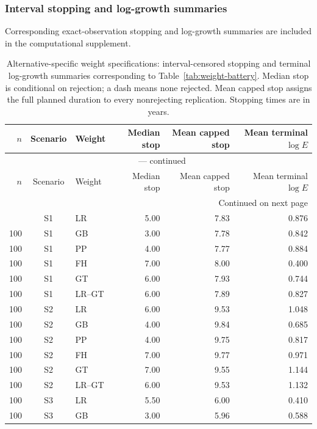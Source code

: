 \documentclass[12pt]{article}
\theoremstyle{definition}
\theoremstyle{remark}
\begin{document}
\subsubsection{Interval stopping and log-growth summaries}
Corresponding exact-observation stopping and log-growth summaries are included in the computational supplement.
\par
\begingroup
\scriptsize
\setlength{\tabcolsep}{3pt}
\renewcommand{\arraystretch}{1.10}
\setlength{\LTcapwidth}{\textwidth}
\begin{longtable}{rclrrr}
\caption{Alternative-specific weight specifications: interval-censored stopping and terminal log-growth summaries corresponding to Table~\ref{tab:weight-battery}. Median stop is conditional on rejection; a dash means none rejected. Mean capped stop assigns the full planned duration to every nonrejecting replication. Stopping times are in years.}\label{tab:app-panel-power}\\
\toprule
$n$ & Scenario & Weight & Median stop & Mean capped stop & Mean terminal $\log E$ \\
\midrule
\endfirsthead
\multicolumn{6}{c}{\tablename\ \thetable{} --- continued}\\
\toprule
$n$ & Scenario & Weight & Median stop & Mean capped stop & Mean terminal $\log E$ \\
\midrule
\endhead
\midrule
\multicolumn{6}{r}{Continued on next page}\\
\endfoot
\bottomrule
\endlastfoot
100 & S1 & LR & 5.00 & 7.83 & 0.876 \\
100 & S1 & GB & 3.00 & 7.78 & 0.842 \\
100 & S1 & PP & 4.00 & 7.77 & 0.884 \\
100 & S1 & FH & 7.00 & 8.00 & 0.400 \\
100 & S1 & GT & 6.00 & 7.93 & 0.744 \\
100 & S1 & LR--GT & 6.00 & 7.89 & 0.827 \\
100 & S2 & LR & 6.00 & 9.53 & 1.048 \\
100 & S2 & GB & 4.00 & 9.84 & 0.685 \\
100 & S2 & PP & 4.00 & 9.75 & 0.817 \\
100 & S2 & FH & 7.00 & 9.77 & 0.971 \\
100 & S2 & GT & 7.00 & 9.55 & 1.144 \\
100 & S2 & LR--GT & 6.00 & 9.53 & 1.132 \\
100 & S3 & LR & 5.50 & 6.00 & 0.410 \\
100 & S3 & GB & 3.00 & 5.96 & 0.588 \\

\end{longtable}
\end{document}
